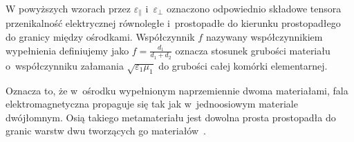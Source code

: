 W powyższych wzorach przez $\varepsilon_{\parallel}$ i~$\varepsilon_{\perp}$ oznaczono odpowiednio składowe tensora przenikalność elektrycznej równoległe i~prostopadłe do kierunku prostopadłego do granicy między ośrodkami. Współczynnik $f$ nazywany współczynnikiem wypełnienia definiujemy jako $f=\frac{d_1}{d_1+d_2}$ oznacza stosunek grubości materiału o~współczynniku załamania $\sqrt{\varepsilon_1 \mu_1}$ do grubości całej komórki elementarnej.

Oznacza to, że w~ośrodku wypełnionym naprzemiennie dwoma materiałami, fala elektromagnetyczna propaguje się tak jak w~jednoosiowym materiale dwójłomnym. Osią takiego metamateriału jest dowolna prosta prostopadła do granic warstw dwu tworzących go materiałów~\cite{sihvola1999electromagnetic}.







